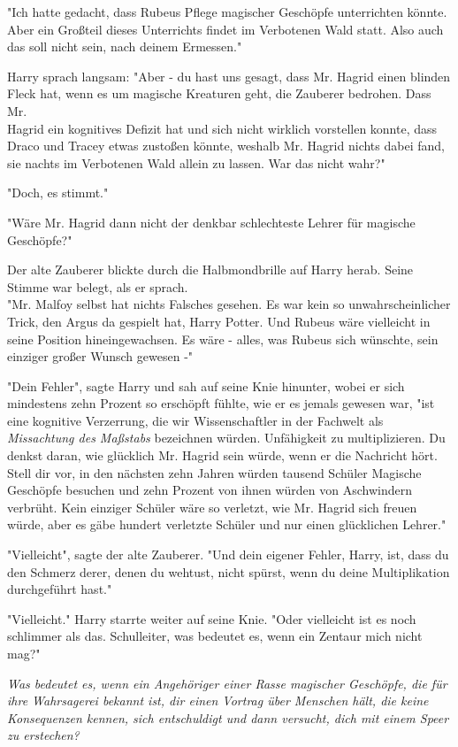 {"Ich hatte gedacht, dass Rubeus Pflege magischer Geschöpfe unterrichten könnte.\\ Aber ein Großteil dieses Unterrichts findet im Verbotenen Wald statt. Also auch das soll nicht sein, nach deinem Ermessen."

Harry sprach langsam: "Aber - du hast uns gesagt, dass Mr. Hagrid einen blinden Fleck hat, wenn es um magische Kreaturen geht, die Zauberer bedrohen. Dass Mr.\\ Hagrid ein kognitives Defizit hat und sich nicht wirklich vorstellen konnte, dass Draco und Tracey etwas zustoßen könnte, weshalb Mr. Hagrid nichts dabei fand, sie nachts im Verbotenen Wald allein zu lassen. War das nicht wahr?"

"Doch, es stimmt."

"Wäre Mr. Hagrid dann nicht der denkbar schlechteste Lehrer für magische Geschöpfe?"

Der alte Zauberer blickte durch die Halbmondbrille auf Harry herab. Seine Stimme war belegt, als er sprach.\\ "Mr. Malfoy selbst hat nichts Falsches gesehen. Es war kein so unwahrscheinlicher Trick, den Argus da gespielt hat, Harry Potter. Und Rubeus wäre vielleicht in seine Position hineingewachsen. Es wäre - alles, was Rubeus sich wünschte, sein einziger großer Wunsch gewesen -"

"Dein Fehler", sagte Harry und sah auf seine Knie hinunter, wobei er sich mindestens zehn Prozent so erschöpft fühlte, wie er es jemals gewesen war, "ist eine kognitive Verzerrung, die wir Wissenschaftler in der Fachwelt als \emph{Missachtung des Maßstabs} bezeichnen würden. Unfähigkeit zu multiplizieren. Du denkst daran, wie glücklich Mr. Hagrid sein würde, wenn er die Nachricht hört. Stell dir vor, in den nächsten zehn Jahren würden tausend Schüler Magische Geschöpfe besuchen und zehn Prozent von ihnen würden von Aschwindern verbrüht. Kein einziger Schüler wäre so verletzt, wie Mr. Hagrid sich freuen würde, aber es gäbe hundert verletzte Schüler und nur einen glücklichen Lehrer."

"Vielleicht", sagte der alte Zauberer. "Und dein eigener Fehler, Harry, ist, dass du den Schmerz derer, denen du wehtust, nicht spürst, wenn du deine Multiplikation durchgeführt hast."

"Vielleicht." Harry starrte weiter auf seine Knie. "Oder vielleicht ist es noch schlimmer als das. Schulleiter, was bedeutet es, wenn ein Zentaur mich nicht mag?"

\emph{Was bedeutet es, wenn ein Angehöriger einer Rasse magischer Geschöpfe, die für ihre Wahrsagerei bekannt ist, dir einen Vortrag über Menschen hält, die keine Konsequenzen kennen, sich entschuldigt und dann versucht, dich mit einem Speer zu erstechen?}

}
